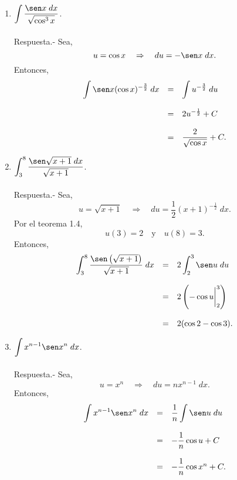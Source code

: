 \begin{enumerate}[\bfseries 1.]
    \item $\displaystyle\int \dfrac{\sen x \; dx}{\sqrt{\cos^3 x}}$.\\\\

	Respuesta.-\; Sea,
	$$u=\cos x \quad \Rightarrow \quad du=-\sen x \; dx.$$
	Entonces,
	$$\begin{array}{rcl}
	    \displaystyle\int \sen x(\cos x)^{-\frac{3}{2}} \; dx &=& \displaystyle\int u^{-\frac{3}{2}}\; du\\\\
								  &=& 2u^{-\frac{1}{2}} +C\\\\
								  &=& \dfrac{2}{\sqrt{\cos x}}+C.
	\end{array}$$
	\vspace{.5cm}

    \item $\displaystyle\int_3^8 \dfrac{\sen \sqrt{x+1}\; dx}{\sqrt{x+1}}$.\\\\

	Respuesta.-\; Sea,
	$$u=\sqrt{x+1}\quad \Rightarrow \quad du=\dfrac{1}{2}(x+1)^{-\frac{1}{2}}\; dx.$$
	Por el teorema 1.4,
	$$u(3)=2\quad \mbox{y}\quad u(8)=3.$$
	Entonces,
	$$\begin{array}{rcl}
	    \displaystyle\int_3^8 \dfrac{\sen\left(\sqrt{x+1}\right)}{\sqrt{x+1}}\;dx &=& 2\displaystyle\int_2^3 \sen u\; du \\\\
										      &=& 2\left(-\cos u \bigg|_2^3\right)\\\\
										      &=& 2(\cos 2 - \cos 3).
	\end{array}$$
	\vspace{.5cm}

    \item $\displaystyle\int x^{n-1}\sen x^n \; dx$.\\\\

	Respuesta.-\; Sea,
	$$u=x^n \quad \Rightarrow \quad du=nx^{n-1}\; dx.$$
	Entonces,
	$$\begin{array}{rcl}
	    \displaystyle\int x^{n-1} \sen x^n \; dx &=& \dfrac{1}{n} \displaystyle\int \sen u \; du\\\\
						     &=& -\dfrac{1}{n} \cos u + C\\\\
						     &=& -\dfrac{1}{n} \cos x^n + C.
	\end{array}$$
	\vspace{.5cm}


\end{enumerate}
